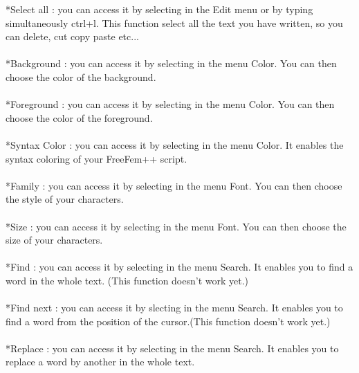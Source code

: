 \documentclass[a4paper]{report}
\begin{document}
*Select all : you can access it by selecting in the Edit menu or by typing simultaneously ctrl+l. This function select all the text you have written, so you can delete, cut copy paste etc...\\
\\
*Background : you can access it by selecting in the menu Color. You can then choose the color of the background.\\
\\
*Foreground : you can access it by selecting in the menu Color. You can then choose the color of the foreground.\\
\\
*Syntax Color : you can access it by selecting in the menu Color. It enables the syntax coloring of your FreeFem++ script.\\
\\
*Family : you can access it by selecting in the menu Font. You can then choose the style of your characters.\\
\\
*Size : you can access it by selecting in the menu Font. You can then choose the size of your characters.\\
\\
*Find : you can access it by selecting in the menu Search. It enables you to find a word in the whole text. (This function doesn't work yet.)\\
\\
*Find next : you can access it by slecting in the menu Search. It enables you to find a word from the position of the cursor.(This function doesn't work yet.)\\
\\
*Replace : you can access it by selecting in the menu Search. It enables you to replace a word by another in the whole text.\\
\end{document}
